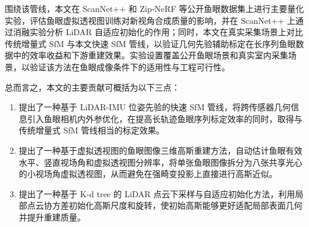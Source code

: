 围绕该管线，本文在 ScanNet++ 和 Zip-NeRF 等公开鱼眼数据集上进行主要量化实验，评估鱼眼虚拟透视图训练对新视角合成质量的影响，并在 ScanNet++ 上通过消融实验分析 LiDAR 自适应初始化的作用；同时，本文在真实采集场景上对比传统增量式 SfM 与本文快速 SfM 管线，以验证几何先验辅助标定在长序列鱼眼数据中的效率收益和下游重建效果。实验设置覆盖公开鱼眼场景和真实室内采集场景，以验证该方法在鱼眼成像条件下的适用性与工程可行性。

总而言之，本文的主要贡献可概括为以下三点：

\begin{enumerate}
    \item 提出了一种基于 LiDAR-IMU 位姿先验的快速 SfM 管线，将跨传感器几何信息引入鱼眼相机内外参优化，在提高长轨迹鱼眼序列标定效率的同时，取得与传统增量式 SfM 管线相当的标定效果。
    \item 提出了一种基于虚拟透视图的鱼眼图像三维高斯重建方法，自动估计鱼眼有效水平、竖直视场角和虚拟透视图分辨率，将单张鱼眼图像拆分为八张共享光心的小视场角虚拟透视图，从而避免在强畸变投影上直接进行高斯近似。
    \item 提出了一种基于 K-d tree 的 LiDAR 点云下采样与自适应初始化方法，利用局部点云协方差初始化高斯尺度和旋转，使初始高斯能够更好适配局部表面几何并提升重建质量。
\end{enumerate}
